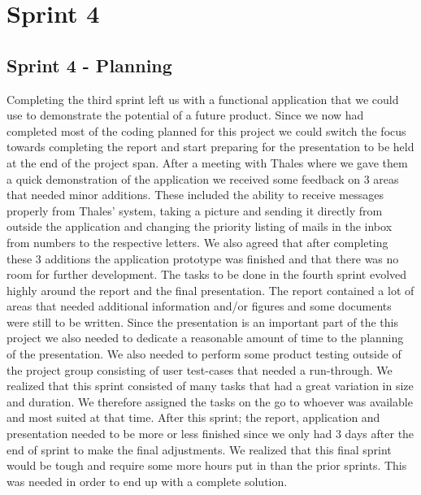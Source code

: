 \chapter{Sprint 4}

\section{Sprint 4 - Planning}


Completing the third sprint left us with a functional application that we could use to demonstrate the potential of a future product. Since we now had completed most of the coding planned for this project we could switch the focus towards completing the report and start preparing for the presentation to be held at the end of the project span.
\newline
After a meeting with Thales where we gave them a quick demonstration of the application we received some feedback on 3 areas that needed minor additions. These included the ability to receive messages properly from Thales' system, taking a picture and sending it directly from outside the application and changing the priority listing of mails in the inbox from numbers to the respective letters. We also agreed that after completing these 3 additions the application prototype was finished and that there was no room for further development.
\newline
The tasks to be done in the fourth sprint evolved highly around the report and the final presentation. The report contained a lot of areas that needed additional information and/or figures and some documents were still to be written. Since the presentation is an important part of the this project we also needed to dedicate a reasonable amount of time to the planning of the presentation. We also needed to perform some product testing outside of the project group consisting of user test-cases that needed a run-through. We realized that this sprint consisted of many tasks that had a great variation in size and duration. We therefore assigned the tasks on the go to whoever was available and most suited at that time.
\newline
After this sprint; the report, application and presentation needed to be more or less finished since we only had 3 days after the end of sprint to make the final adjustments. We realized that this final sprint would be tough and require some more hours put in than the prior sprints. This was needed in order to end up with a complete solution. 
      